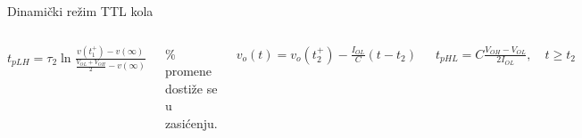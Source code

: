 \begin{frame}[label=10-s066]{Dinamički režim TTL kola}
\setlength{\abovedisplayskip}{4pt}\setlength{\belowdisplayskip}{4pt}\setlength{\abovedisplayshortskip}{3pt}\setlength{\belowdisplayshortskip}{3pt}
\begin{columns}[T,onlytextwidth]\centering
{}\centering\par\smallskip
\(\displaystyle t_{pLH}=\tau_2\ln\frac{v(t_1^+)-v(\infty)}{\frac{V_{OL}+V_{OH}}2-v(\infty)}\)\par{}\% promene dostiže se u zasićenju.\par\smallskip
\(\displaystyle v_o(t)=v_o(t_2^+)-\frac{I_{OL}}C(t-t_2)\)\par\smallskip
\(\displaystyle t_{pHL}=C\frac{V_{OH}-V_{OL}}{2I_{OL}},\quad t\geq t_2\)\par\smallskip
\end{columns}
\end{frame}
